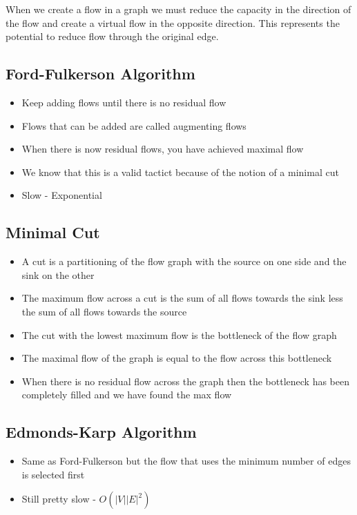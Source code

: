 \documentclass[a4paper]{article}
\begin{document}
		 When we create a flow in a graph we must reduce the capacity in the direction of the flow and create a virtual flow in the opposite direction. This represents the potential to reduce flow through the original edge. 

\subsection{Ford-Fulkerson Algorithm}
		 \begin{itemize}
				 \item Keep adding flows until there is no residual flow
				 \item Flows that can be added are called augmenting flows
				 \item When there is now residual flows, you have achieved maximal flow
				 \item We know that this is a valid tactict because of the notion of a minimal cut
				 \item Slow - Exponential
		 \end{itemize}
\subsection{Minimal Cut}
		 \begin{itemize}
				 \item A cut is a partitioning of the flow graph with the source on one side and the sink on the other
				 \item The maximum flow across a cut is the sum of all flows towards the sink less the sum of all flows towards the source
				 \item The cut with the lowest maximum flow is the bottleneck of the flow graph
				 \item The maximal flow of the graph is equal to the flow across this bottleneck
				 \item When there is no residual flow across the graph then the bottleneck has been completely filled and we have found the max flow
		 \end{itemize}
\subsection{Edmonds-Karp Algorithm}
		 \begin{itemize}
				 \item Same as Ford-Fulkerson but the flow that uses the minimum number of edges is selected first
				 \item Still pretty slow - $O(|V||E|^2)$
		 \end{itemize}
\end{document}
